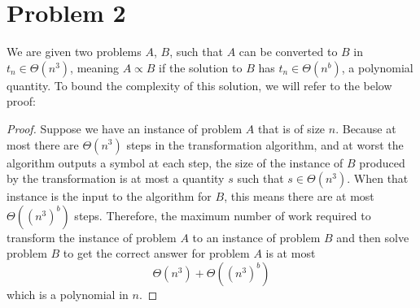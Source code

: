 \section*{Problem 2}

We are given two problems $A$, $B$, such that $A$ can be converted to $B$ in $t_n \in \Theta(n^3)$, meaning $A \propto B$ if the solution to $B$ has $t_n \in \Theta(n^b)$, a polynomial quantity. To bound the complexity of this solution, we will refer to the below proof:

\begin{proof}
Suppose we have an instance of problem $A$ that is of size $n$. Because at most there are $\Theta(n^3)$ steps in the transformation algorithm, and at worst the algorithm outputs a symbol at each step, the size of the instance of $B$ produced by the transformation is at most a quantity $s$ such that $s \in \Theta(n^3)$. When that instance is the input to the algorithm for $B$, this means there are at most $\Theta\left((n^3)^b\right)$ steps. Therefore, the maximum number of work required to transform the instance of problem $A$ to an instance of problem $B$ and then solve problem $B$ to get the correct answer for problem $A$ is at most
$$
\Theta(n^3) + \Theta\left((n^3)^b\right)
$$
which is a polynomial in $n$.
\end{proof}
